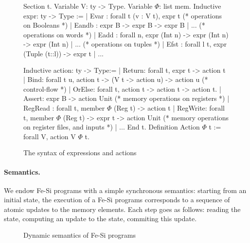 \documentclass[preprint]{sigplanconf}
\begin{document}
\begin{figure}
  \centering
\begin{coq}
Section t. 
Variable V: ty -> Type. Variable $\Phi$: list mem. 
Inductive expr: ty -> Type :=
| Evar : forall t (v : V t), expr t
(* operations on Booleans *)
| Eandb : expr B -> expr B -> expr B | ... 
(* operations on words *)
| Eadd : forall n, expr (Int n) -> expr (Int n) -> expr (Int n) | ... 
(* operations on tuples *)
| Efst : forall l t, expr (Tuple (t::l)) -> expr t | ...

Inductive action: ty -> Type:=
| Return: forall t, expr t -> action t
| Bind: forall t u,  action  t -> (V t -> action u) -> action u
(* control-flow *)
| OrElse: forall t, action t -> action t -> action t.
| Assert: expr B -> action Unit    
(* memory operations on registers *)
| RegRead : forall t, member $\Phi$ (Reg t) -> action t
| RegWrite: forall t, member $\Phi$ (Reg t) -> expr t -> action Unit
(* memory operations on register files, and inputs *)
| ... 
End t. 
Definition Action $\Phi$ t := forall V, action V $\Phi$ t.  
\end{coq}
  \caption{The syntax of expressions and actions}
  \label{fig:fesi}
\end{figure}

\paragraph{Semantics.}
We endow Fe-Si programs with a simple synchronous semantics:  starting
from an initial state, the execution of a Fe-Si programs corresponds
to a sequence of atomic updates to the memory elements. 
%
Each step goes as follows: reading the state, computing an update to
the state, commiting this update.
%

\begin{figure*}
  \centering
\caption{Dynamic semantics of Fe-Si programs}\label{fig:fesi-sem}
\end{figure*}
\end{document}
